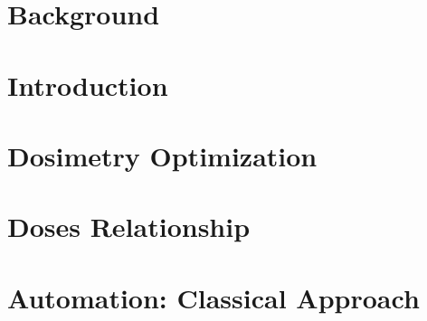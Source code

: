\documentclass[a4paper,12pt]{book}
\begin{document}
	
	
	
	
	
	
	
	\listoffigures
	\listoftables
	\tableofcontents
		
	\chapterStyleToC
	
	\graphicspath{ {1_background/} }
	\chapter{Background}
	\begin{chapterabstract}
		
	\end{chapterabstract}
	\clearpage
	\localtableofcontents
	
	
	\graphicspath{ {../2_introduction/} }
	\chapter{Introduction}
	\begin{chapterabstract}
		
	\end{chapterabstract}
	\clearpage
	\localtableofcontents
	
	
	\graphicspath{ {../3_dosimetry_optimization/} }
	\chapter{Dosimetry Optimization}
	\begin{chapterabstract}
		
	\end{chapterabstract}
	\clearpage
	\localtableofcontents
	
	
	\graphicspath{ {../4_doses_relations/} }
	\chapter{Doses Relationship}
	\begin{chapterabstract}
		
	\end{chapterabstract}
	\clearpage
	\localtableofcontents
	
	
	\chapter{Automation: Classical Approach}
	\begin{chapterabstract}
	\end{chapterabstract}
	\clearpage
	\localtableofcontents
\end{document}
